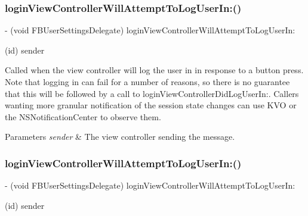 \subsubsection{\texorpdfstring{login\+View\+Controller\+Will\+Attempt\+To\+Log\+User\+In\+:()}{loginViewControllerWillAttemptToLogUserIn:()}\hspace{0.1cm}{\footnotesize\ttfamily [3/5]}}
{\footnotesize\ttfamily -\/ (void F\+B\+User\+Settings\+Delegate) login\+View\+Controller\+Will\+Attempt\+To\+Log\+User\+In\+: \begin{DoxyParamCaption}\item[{(id)}]{sender }\end{DoxyParamCaption}\hspace{0.3cm}{\ttfamily [optional]}}

Called when the view controller will log the user in in response to a button press. Note that logging in can fail for a number of reasons, so there is no guarantee that this will be followed by a call to login\+View\+Controller\+Did\+Log\+User\+In\+:. Callers wanting more granular notification of the session state changes can use K\+VO or the N\+S\+Notification\+Center to observe them.


\begin{DoxyParams}{Parameters}
{\em sender} & The view controller sending the message. \\
\hline
\end{DoxyParams}
\mbox{\label{protocolFBUserSettingsDelegate_01-p_a29fe822340933959a1b01785c50b7c4b}} 
\subsubsection{\texorpdfstring{login\+View\+Controller\+Will\+Attempt\+To\+Log\+User\+In\+:()}{loginViewControllerWillAttemptToLogUserIn:()}\hspace{0.1cm}{\footnotesize\ttfamily [4/5]}}
{\footnotesize\ttfamily -\/ (void F\+B\+User\+Settings\+Delegate) login\+View\+Controller\+Will\+Attempt\+To\+Log\+User\+In\+: \begin{DoxyParamCaption}\item[{(id)}]{sender }\end{DoxyParamCaption}\hspace{0.3cm}{\ttfamily [optional]}}

